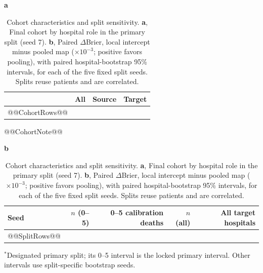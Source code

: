 \documentclass[11pt]{article}
\begin{document}
\begin{table}[p]
\caption{Cohort characteristics and split sensitivity. \textbf{a}, Final cohort by hospital role in the primary split (seed 7). \textbf{b}, Paired $\Delta$Brier, local intercept minus pooled map ($\times10^{-3}$; positive favors pooling), with paired hospital-bootstrap 95\% intervals, for each of the five fixed split seeds. Splits reuse patients and are correlated.}
\label{tab:splits}
\centering\footnotesize
\textbf{a}\quad\begin{tabular}[t]{@{}lrrr@{}}
\toprule
 & All & Source & Target \\
\midrule
@@CohortRows@@
\bottomrule
\end{tabular}

\vspace{2pt}
{\scriptsize @@CohortNote@@}

\vspace{8pt}
\textbf{b}\quad\begin{tabular}[t]{@{}lrrrr@{}}
\toprule
Seed & $n$ (0--5) & 0--5 calibration deaths & $n$ (all) & All target hospitals \\
\midrule
@@SplitRows@@
\bottomrule
\end{tabular}

\vspace{2pt}
{\scriptsize $^*$Designated primary split; its 0--5 interval is the locked primary interval. Other intervals use split-specific bootstrap seeds.}
\end{table}
\end{document}
